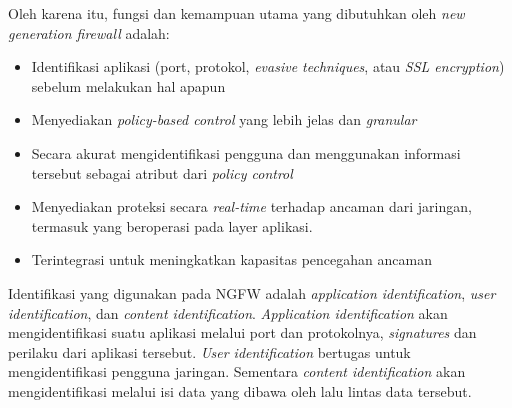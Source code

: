 Oleh karena itu, fungsi dan kemampuan utama yang dibutuhkan oleh \textit{new generation firewall} adalah:
\begin{itemize}
	\item Identifikasi aplikasi (port, protokol, \textit{evasive techniques}, atau \textit{SSL encryption}) sebelum melakukan hal apapun
	\item Menyediakan \textit{policy-based control} yang lebih jelas dan \textit{granular}
	\item Secara akurat mengidentifikasi pengguna dan menggunakan informasi tersebut sebagai atribut dari \textit{policy control}
	\item Menyediakan proteksi secara \textit{real-time} terhadap ancaman dari jaringan, termasuk yang beroperasi pada layer aplikasi.
	\item Terintegrasi untuk meningkatkan kapasitas pencegahan ancaman
\end{itemize}

Identifikasi yang digunakan pada NGFW adalah \textit{application identification}, \textit{user identification}, dan \textit{content identification}. \textit{Application identification} akan mengidentifikasi suatu aplikasi melalui port dan protokolnya, \textit{signatures} dan perilaku dari aplikasi tersebut. \textit{User identification} bertugas untuk mengidentifikasi pengguna jaringan. Sementara \textit{content identification} akan mengidentifikasi melalui isi data yang dibawa oleh lalu lintas data tersebut. \\

